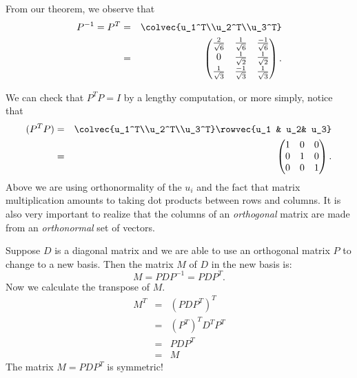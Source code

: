 \begin{example}
From our theorem, we observe that
\begin{eqnarray*}
P^{-1}=P^T &=& \colvec{u_1^T\\u_2^T\\u_3^T} \\
&=& \begin{pmatrix}
\frac{2}{\sqrt{6}}& \frac{1}{\sqrt{6}}& \frac{-1}{\sqrt{6}}\\[1mm]
0 & \frac{1}{\sqrt{2}}&\frac{1}{\sqrt{2}} \\[1mm]
\frac{1}{\sqrt{3}}& \frac{-1}{\sqrt{3}}&\frac{1}{\sqrt{3}}\\[1mm]
\end{pmatrix}. \\
\end{eqnarray*}

We can check that $P^TP=I$ by a lengthy computation, or more simply, notice that
\begin{eqnarray*}
(P^TP)%
&=& \colvec{u_1^T\\u_2^T\\u_3^T} \rowvec{u_1 & u_2& u_3} \\
&=& \begin{pmatrix}1&0&0\\0&1&0\\0&0&1\end{pmatrix}.
\end{eqnarray*}
Above we are using orthonormality of the $u_i$ and the fact that matrix multiplication amounts to taking dot products between rows and columns.
It is also very \hypertarget{basisorthog}{important to realize that the columns of an {\it orthogonal} matrix are made
from an {\it orthonormal} set of vectors}.
\end{example}

\begin{remark}
Suppose $D$ is a diagonal matrix  and we are able to use an orthogonal matrix $P$ to change to a new basis.  Then the matrix $M$ of $D$ in the new basis is:
\[
M = PDP^{-1} = PDP^T.
\]
Now we calculate the transpose of $M$.
\begin{eqnarray*}
M^T &=& (PDP^T)^T\\
&=& (P^T)^TD^TP^T \\
&=& PDP^T\\
&=& M
\end{eqnarray*}
The matrix $M=PDP^T$ is symmetric!
\end{remark}


